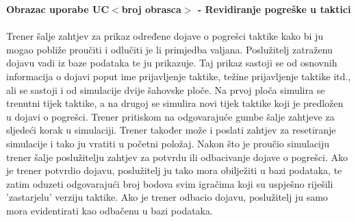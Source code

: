 				\eject
				
				\textbf{Obrazac uporabe UC$<$broj obrasca$>$ - Revidiranje pogreške u taktici}\\
				\\Trener šalje zahtjev za prikaz određene dojave o pogrešci taktike kako bi ju mogao pobliže proučiti i odlučiti je li primjedba valjana. Poslužitelj zatraženu dojavu vadi iz baze podataka te ju prikazuje. Taj prikaz sastoji se od osnovnih informacija o dojavi poput ime prijavljenje taktike, težine prijavljenje taktike itd., ali se sastoji i od simulacije dvije šahovske ploče. Na prvoj ploča simulira se trenutni tijek taktike, a na drugoj se simulira novi tijek taktike koji je predložen u dojavi o pogrešci. Trener pritiskom na odgovarajuće gumbe šalje zahtjeve za sljedeći korak u simulaciji. Trener također može i poslati zahtjev za resetiranje simulacije i tako ju vratiti u početni položaj. Nakon što je proučio simulaciju trener šalje poslužitelju zahtjev za potvrdu ili odbacivanje dojave o pogrešci. Ako je trener potvrdio dojavu, poslužitelj ju tako mora obilježiti u bazi podataka, te zatim oduzeti odgovarajući broj bodova svim igračima koji su uspješno riješili 'zastarjelu' verziju taktike. Ako je trener odbacio dojavu, poslužitelj ju samo mora evidentirati kao odbačenu u bazi podataka.
			

